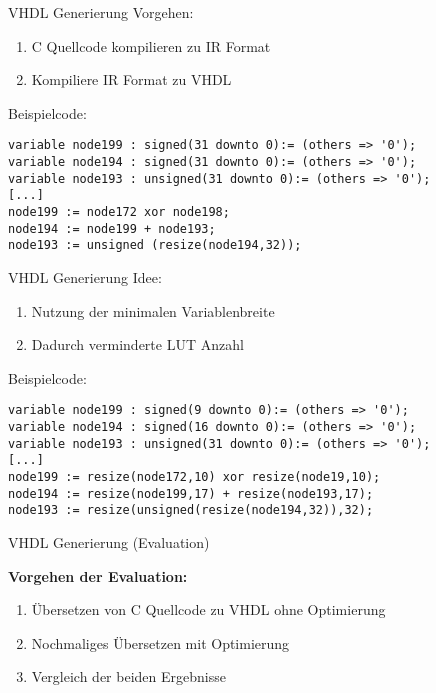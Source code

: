 
\begin{frame}[fragile]{VHDL Generierung}
Vorgehen:
\begin{enumerate}
	\item C Quellcode kompilieren zu IR Format
	\item Kompiliere IR Format zu VHDL
\end{enumerate}

Beispielcode:
\begin{lstlisting}
variable node199 : signed(31 downto 0):= (others => '0'); 
variable node194 : signed(31 downto 0):= (others => '0'); 
variable node193 : unsigned(31 downto 0):= (others => '0'); 
[...]
node199 := node172 xor node198;
node194 := node199 + node193;
node193 := unsigned (resize(node194,32));
\end{lstlisting}
\end{frame}

\begin{frame}[fragile]{VHDL Generierung}
Idee:
\begin{enumerate}
	\item Nutzung der minimalen Variablenbreite
	\item Dadurch verminderte LUT Anzahl
\end{enumerate}

Beispielcode:
\begin{lstlisting}
variable node199 : signed(9 downto 0):= (others => '0'); 
variable node194 : signed(16 downto 0):= (others => '0'); 
variable node193 : unsigned(31 downto 0):= (others => '0'); 
[...]
node199 := resize(node172,10) xor resize(node19,10);	
node194 := resize(node199,17) + resize(node193,17);	
node193 := resize(unsigned(resize(node194,32)),32);	
\end{lstlisting}
\end{frame}

\begin{frame}{VHDL Generierung (Evaluation)}

\textbf{Vorgehen der Evaluation:}
\begin{enumerate}
	\item Übersetzen von C Quellcode zu VHDL ohne Optimierung
	\item Nochmaliges Übersetzen mit Optimierung
	\item Vergleich der beiden Ergebnisse
\end{enumerate}
\end{frame}

